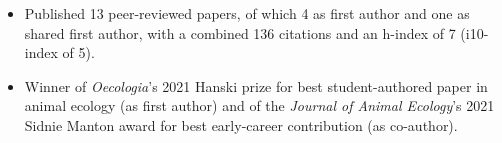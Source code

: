 


\begin{itemize}
  \item Published 13 peer-reviewed papers, of which 4 as first author and one as shared first author, with a combined 136 citations and an h-index of 7 (i10-index of 5).
  \item Winner of \textit{Oecologia}'s 2021 Hanski prize for best student-authored paper in animal ecology (as first author) and of the \textit{Journal of Animal Ecology}'s 2021 Sidnie Manton award for best early-career contribution (as co-author).
\end{itemize}